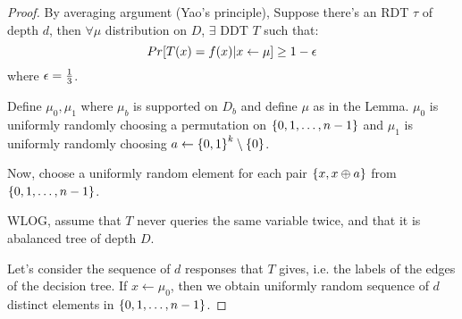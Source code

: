 \begin{proof}
    By averaging argument (Yao's principle), Suppose there's an RDT $\tau$ of depth $d$, then $\forall \mu$ distribution on $D$, $\exists$ DDT $T$ such that:
    \begin{equation}
        Pr[T(x) = f(x) \vert x \leftarrow \mu] \geq 1 - \epsilon
    \end{equation}
    where $\epsilon = \frac{1}{3}$. 

    Define $\mu_0, \mu_1$ where $\mu_b$ is supported on $D_b$ and define $\mu$ as in the Lemma. $\mu_0$ is uniformly randomly choosing a permutation on $\set{0, 1, \ldots, n-1}$ and $\mu_1$ is uniformly randomly choosing $a \leftarrow \set{0, 1}^k \setminus \set{0}$. 

    Now, choose a uniformly random element for each pair $\set{x, x\oplus a}$ from $\set{0, 1, \ldots, n-1}$. 

    WLOG, assume that $T$ never queries the same variable twice, and that it is  abalanced tree of depth $D$.

    Let's consider the sequence of $d$ responses that $T$ gives, i.e. the labels of the edges of the decision tree. If $x \leftarrow \mu_0$, then we obtain uniformly random sequence of $d$ distinct elements in $\set{0, 1, \ldots, n-1}$. 


\end{proof}

